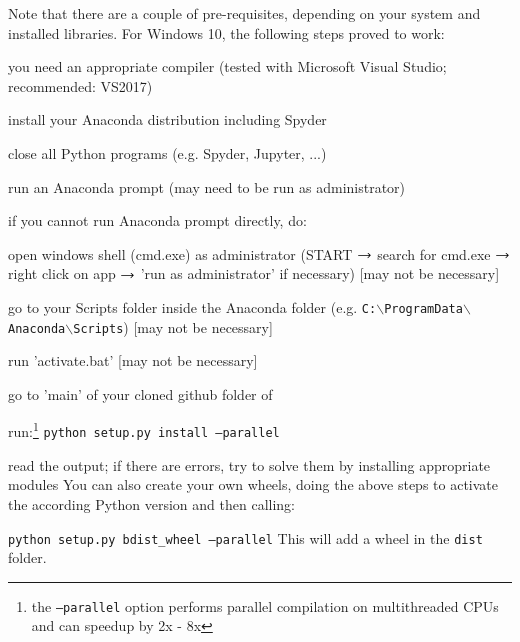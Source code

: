 %


Note that there are a couple of pre-requisites, depending on your system and installed libraries. For Windows 10, the following steps proved to work:
\bi
  \item you need an appropriate compiler (tested with Microsoft Visual Studio; recommended: VS2017)
  \item install your Anaconda distribution including Spyder
  \item close all Python programs (e.g. Spyder, Jupyter, ...) 
  \item run an Anaconda prompt (may need to be run as administrator)
  \item if you cannot run Anaconda prompt directly, do:
  \bi
    \item open windows shell (cmd.exe) as administrator (START $\rightarrow$ search for cmd.exe $\rightarrow$ right click on app $\rightarrow$ 'run as administrator' if necessary) [may not be necessary]
    \item go to your Scripts folder inside the Anaconda folder (e.g. \texttt{C:$\backslash$ProgramData$\backslash$Anaconda$\backslash$Scripts}) [may not be necessary]
    \item run 'activate.bat' [may not be necessary]
  \ei
  \item go to 'main' of your cloned github folder of \codeName\ 
  \item run:\footnote{the \texttt{--parallel} option performs parallel compilation on multithreaded CPUs and can speedup by 2x - 8x} \texttt{python setup.py install --parallel}
  \item read the output; if there are errors, try to solve them by installing appropriate modules
\ei
You can also create your own wheels, doing the above steps to activate the according Python version and then calling:
\bi
  \item[] \texttt{python setup.py bdist\_wheel --parallel}
\ei
This will add a wheel in the \texttt{dist} folder.

